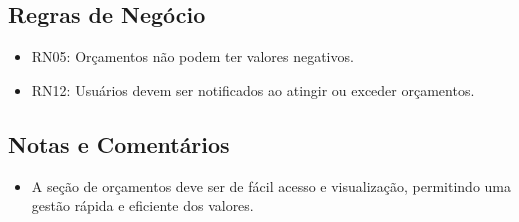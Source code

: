 \subsection*{Regras de Negócio}
\begin{addmargin}[1.5cm]{0cm}
	\begin{itemize}
		\item RN05: Orçamentos não podem ter valores negativos.
		\item RN12: Usuários devem ser notificados ao atingir ou exceder orçamentos.
	\end{itemize}
\end{addmargin}

\subsection*{Notas e Comentários}
\begin{addmargin}[1.5cm]{0cm}
	\begin{itemize}
		\item A seção de orçamentos deve ser de fácil acesso e visualização, permitindo uma gestão rápida e eficiente dos valores.
	\end{itemize}
\end{addmargin}
